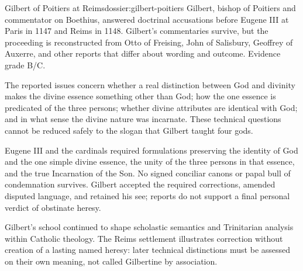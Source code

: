 \begin{heresydossier}{Gilbert of Poitiers at Reims}{dossier:gilbert-poitiers}
\objectfield Gilbert, bishop of Poitiers and commentator on Boethius, answered doctrinal accusations before Eugene III at Paris in 1147 and Reims in 1148. Gilbert's commentaries survive, but the proceeding is reconstructed from Otto of Freising, John of Salisbury, Geoffrey of Auxerre, and other reports that differ about wording and outcome. Evidence grade B/C.

\propositionfield The reported issues concern whether a real distinction between God and divinity makes the divine essence something other than God; how the one essence is predicated of the three persons; whether divine attributes are identical with God; and in what sense the divine nature was incarnate. These technical questions cannot be reduced safely to the slogan that Gilbert taught four gods.

\responsefield Eugene III and the cardinals required formulations preserving the identity of God and the one simple divine essence, the unity of the three persons in that essence, and the true Incarnation of the Son. No signed conciliar canons or papal bull of condemnation survives. Gilbert accepted the required corrections, amended disputed language, and retained his see; reports do not support a final personal verdict of obstinate heresy.

\aftermathfield Gilbert's school continued to shape scholastic semantics and Trinitarian analysis within Catholic theology. The Reims settlement illustrates correction without creation of a lasting named heresy: later technical distinctions must be assessed on their own meaning, not called Gilbertine by association.
\end{heresydossier}

